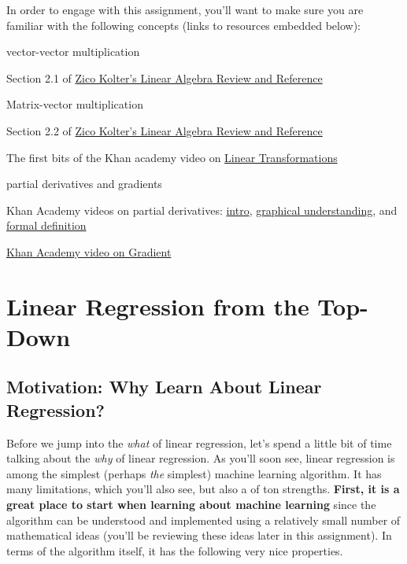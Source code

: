 \documentclass[assignment01_Solutions]{subfiles}
\begin{document}
In order to engage with this assignment, you'll want to make sure you are familiar with the following concepts (links to resources embedded below):
\bi
\item vector-vector multiplication
\bi
\item Section 2.1 of \href{https://see.stanford.edu/materials/aimlcs229/cs229-linalg.pdf}{Zico Kolter's Linear Algebra Review and Reference}
\ei
\item Matrix-vector multiplication
\bi
\item Section 2.2 of \href{https://see.stanford.edu/materials/aimlcs229/cs229-linalg.pdf}{Zico Kolter's Linear Algebra Review and Reference}
\item The first bits of the Khan academy video on \href{https://www.khanacademy.org/math/linear-algebra/matrix-transformations/linear-transformations/v/matrix-vector-products-as-linear-transformations}{Linear Transformations}
\ei
\item partial derivatives and gradients
\bi
\item Khan Academy videos on partial derivatives: \href{https://www.khanacademy.org/math/multivariable-calculus/multivariable-derivatives/partial-derivatives/v/partial-derivatives-introduction}{intro}, \href{https://www.khanacademy.org/math/multivariable-calculus/multivariable-derivatives/partial-derivatives/v/partial-derivatives-and-graphs}{graphical understanding}, and \href{https://www.khanacademy.org/math/multivariable-calculus/multivariable-derivatives/partial-derivatives/v/formal-definition-of-partial-derivatives}{formal definition}
\item \href{https://www.khanacademy.org/math/multivariable-calculus/multivariable-derivatives/gradient-and-directional-derivatives/v/gradient}{Khan Academy video on Gradient}
\ei
\ei

\section{Linear Regression from the Top-Down}

\subsection*{Motivation: Why Learn About Linear Regression?}
Before we jump into the \emph{what} of linear regression, let's spend a little bit of time talking about the \emph{why} of linear regression.  As you'll soon see, linear regression is among the simplest (perhaps \emph{the} simplest) machine learning algorithm.  It has many limitations, which you'll also see, but also a of ton strengths.  \textbf{First, it is a great place to start when learning about machine learning} since the algorithm can be understood and implemented using a relatively small number of mathematical ideas (you'll be reviewing these ideas later in this assignment).  In terms of the algorithm itself, it has the following very nice properties.
\end{document}
